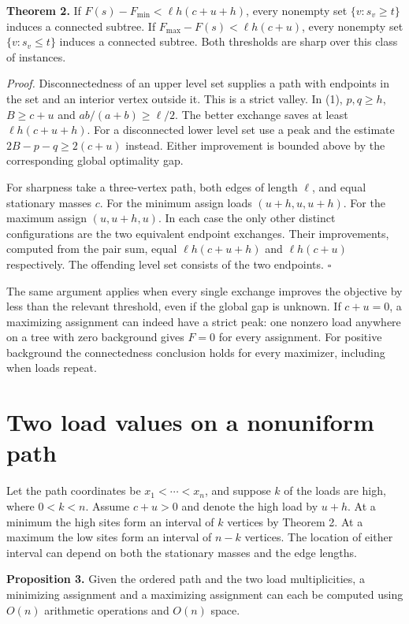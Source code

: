 \documentclass[11pt]{article}
\begin{document}
\textbf{Theorem 2.} If $F(s)-F_{\min}<\ell h(c+u+h)$, every nonempty set $\{v:s_v\ge t\}$ induces a connected subtree. If $F_{\max}-F(s)<\ell h(c+u)$, every nonempty set $\{v:s_v\le t\}$ induces a connected subtree. Both thresholds are sharp over this class of instances.

\textit{Proof.} Disconnectedness of an upper level set supplies a path with endpoints in the set and an interior vertex outside it. This is a strict valley. In (1), $p,q\ge h$, $B\ge c+u$ and $ab/(a+b)\ge\ell/2$. The better exchange saves at least $\ell h(c+u+h)$. For a disconnected lower level set use a peak and the estimate $2B-p-q\ge2(c+u)$ instead. Either improvement is bounded above by the corresponding global optimality gap.

For sharpness take a three-vertex path, both edges of length $\ell$, and equal stationary masses $c$. For the minimum assign loads $(u+h,u,u+h)$. For the maximum assign $(u,u+h,u)$. In each case the only other distinct configurations are the two equivalent endpoint exchanges. Their improvements, computed from the pair sum, equal $\ell h(c+u+h)$ and $\ell h(c+u)$ respectively. The offending level set consists of the two endpoints. $\square$

The same argument applies when every single exchange improves the objective by less than the relevant threshold, even if the global gap is unknown. If $c+u=0$, a maximizing assignment can indeed have a strict peak: one nonzero load anywhere on a tree with zero background gives $F=0$ for every assignment. For positive background the connectedness conclusion holds for every maximizer, including when loads repeat.
\section{Two load values on a nonuniform path}
Let the path coordinates be $x_1<\cdots<x_n$, and suppose $k$ of the loads are high, where $0<k<n$. Assume $c+u>0$ and denote the high load by $u+h$. At a minimum the high sites form an interval of $k$ vertices by Theorem 2. At a maximum the low sites form an interval of $n-k$ vertices. The location of either interval can depend on both the stationary masses and the edge lengths.

\textbf{Proposition 3.} Given the ordered path and the two load multiplicities, a minimizing assignment and a maximizing assignment can each be computed using $O(n)$ arithmetic operations and $O(n)$ space.
\end{document}
